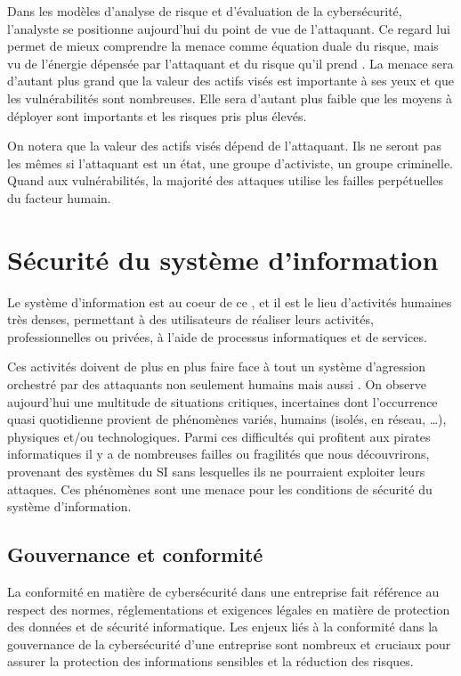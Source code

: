  
Dans les modèles d'analyse de risque et d'évaluation de la cybersécurité, l'analyste se positionne aujourd'hui du point de vue de l'attaquant. Ce regard lui permet de mieux comprendre la menace comme équation duale du risque, mais vu de l'énergie dépensée par l'attaquant et du risque qu'il prend . La menace sera d'autant plus grand que la valeur des actifs visés est importante à ses yeux et que les vulnérabilités sont nombreuses. Elle sera d'autant plus faible que les moyens à déployer sont importants et les risques pris plus élevés.

On notera que la valeur des actifs visés dépend de l'attaquant. Ils ne seront pas les mêmes si l'attaquant est un état, une groupe d'activiste, un groupe criminelle.
Quand aux vulnérabilités, la majorité des attaques utilise les failles perpétuelles du facteur humain.




\section{Sécurité du système d'information}

Le système d'information est au coeur de ce , et il est le lieu d'activités humaines très denses, permettant à des utilisateurs de réaliser leurs activités, professionnelles ou privées, à l'aide de processus informatiques et de services. 

Ces activités doivent de plus en plus faire face à tout un système d'agression orchestré par des attaquants non seulement humains mais aussi . On observe aujourd'hui une multitude de situations critiques, incertaines dont l'occurrence quasi quotidienne provient de phénomènes variés, humains (isolés, en réseau, …), physiques et/ou technologiques. Parmi ces difficultés qui profitent aux pirates informatiques il y a de nombreuses failles ou fragilités que nous découvrirons, provenant des systèmes du SI sans lesquelles ils ne pourraient exploiter leurs attaques. Ces phénomènes sont une menace pour les conditions de sécurité du système d'information.


\subsection{Gouvernance et conformité}

La conformité en matière de cybersécurité dans une entreprise fait référence au respect des normes, réglementations et exigences légales en matière de protection des données et de sécurité informatique. Les enjeux liés à la conformité dans la gouvernance de la cybersécurité d'une entreprise sont nombreux et cruciaux pour assurer la protection des informations sensibles et la réduction des risques.



